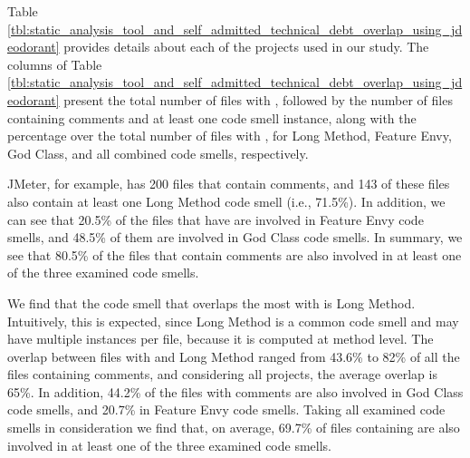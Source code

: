 {Table \ref{tbl:static_analysis_tool_and_self_admitted_technical_debt_overlap_using_jdeodorant} provides details about each of the projects used in our study. The columns of Table \ref{tbl:static_analysis_tool_and_self_admitted_technical_debt_overlap_using_jdeodorant} present the total number of files with \SATD, followed by the number of files containing \SATD comments and at least one code smell instance,
along with the percentage over the total number of files with \SATD, for Long Method, Feature Envy, God Class, and all combined code smells, respectively. 

JMeter, for example, has 200 files that contain \SATD comments, and 143 of these files also contain at least one Long Method code smell (i.e., 71.5\%). In addition, we can see that 20.5\% of the files that have \SATD are involved in Feature Envy code smells, and 48.5\% of them are involved in God Class code smells. In summary, we see that 80.5\% of the files that contain \SATD comments are also involved in at least one of the three examined code smells.     

We find that the code smell that overlaps the most with \SATD is Long Method. Intuitively, this is expected, since Long Method is a common code smell and may have multiple instances per file, because it is computed at method level.
The overlap between files with \SATD and Long Method ranged from 43.6\% to 82\% of all the files containing \SATD comments, and considering all projects, the average overlap is 65\%. In addition, 44.2\% of the files with \SATD comments are also involved in God Class code smells, and 20.7\% in Feature Envy code smells. Taking all examined code smells in consideration we find that, on average, 69.7\% of files containing \SATD are also involved in at least one of the three examined code smells. 


}
